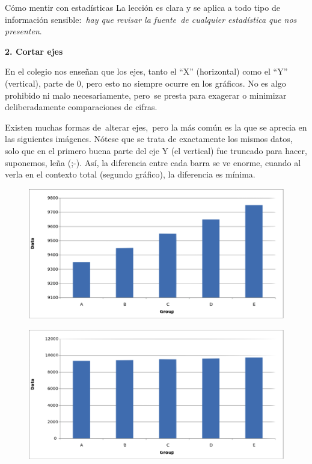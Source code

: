 \begin{myexampleblock}{Cómo mentir con estadísticas}
\vspace{2mm} La lección es clara y se aplica a todo tipo de información sensible: \emph{hay que revisar la fuente de cualquier estadística que nos presenten}.

\vspace{2mm} \textbf{2. Cortar ejes}

\vspace{2mm} En el colegio nos enseñan que los ejes, tanto el ``X'' (horizontal) como el ``Y'' (vertical), parte de 0, pero esto no siempre ocurre en los gráficos. No es algo prohibido ni malo necesariamente, pero se presta para exagerar o minimizar deliberadamente comparaciones de cifras.

\vspace{2mm} Existen muchas formas de alterar ejes, pero la más común es la que se aprecia en las siguientes imágenes. Nótese que se trata de exactamente los mismos datos, solo que en el primero buena parte del eje Y (el vertical) fue truncado para hacer, suponemos, leña (;-). Así, la diferencia entre cada barra se ve enorme, cuando al verla en el contexto total (segundo gráfico), la diferencia es mínima.

\begin{multicols}{2}
	\begin{figure}[H]
			\centering
			\includegraphics[width=.5\textwidth]{imagenes/imagenes01/T01IM32.png}
	\end{figure}
	
	\begin{figure}[H]
			\centering
			\includegraphics[width=.5\textwidth]{imagenes/imagenes01/T01IM33.png}
	\end{figure}
\end{multicols}



\end{myexampleblock}
